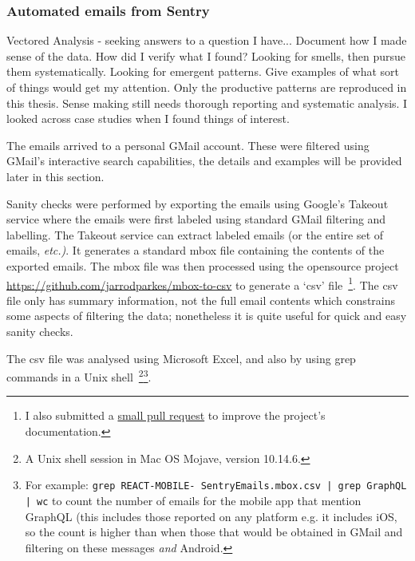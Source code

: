\subsubsection{Automated emails from Sentry}
Vectored Analysis - seeking answers to a question I have...
Document how I made sense of the data. How did I verify what I found?
Looking for smells, then pursue them systematically. Looking for emergent patterns. Give examples of what sort of things would get my attention. Only the productive patterns are reproduced in this thesis. Sense making still needs thorough reporting and systematic analysis. I looked across case studies when I found things of interest.


The emails arrived to a personal GMail account. These were filtered using GMail's interactive search capabilities, the details and examples will be provided later in this section. 

Sanity checks were performed by exporting the emails using Google's Takeout service where the emails were first labeled using standard GMail filtering and labelling. The Takeout service can extract labeled emails (or the entire set of emails, \emph{etc.)}. It generates a standard mbox file containing the contents of the exported emails. The mbox file was then processed using the opensource project \url{https://github.com/jarrodparkes/mbox-to-csv} to generate a `csv' file~\footnote{I also submitted a \href{https://github.com/julianharty/mbox-to-csv/commit/1400823b80b909a6736bccf35ae53707a91685f7}{small pull request} to improve the project's documentation.}. The csv file only has summary information, not the full email contents which constrains some aspects of filtering the data; nonetheless it is quite useful for quick and easy sanity checks. 

The csv file was analysed using Microsoft Excel, and also by using grep commands in a Unix shell~\footnote{A Unix shell session in Mac OS Mojave, version 10.14.6.}\footnote{For example: \texttt{grep REACT-MOBILE- SentryEmails.mbox.csv | grep GraphQL | wc} to count the number of emails for the mobile app that mention GraphQL (this includes those reported on any platform e.g. it includes iOS, so the count is higher than when those that would be obtained in GMail and filtering on these messages \textit{and} Android.}. %

